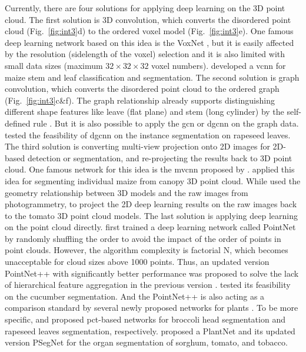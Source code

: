 

Currently, there are four solutions for applying deep learning on the 3D point cloud. 
The first solution is 3D convolution, which converts the disordered point cloud (Fig.~\ref{fig:int3}d) to the ordered voxel model (Fig.~\ref{fig:int3}e). One famous deep learning network based on this idea is the VoxNet \citep{Maturana_VoxNet_2015}, but it is easily affected by the resolution (sidelength of the voxel) selection and it is also limited with small data sizes (maximum $32 \times 32 \times 32$ voxel numbers). \citet{jin_separating_2020} developed a \gls{vcnn} for maize stem and leaf classification and segmentation. 
The second solution is graph convolution, which converts the disordered point cloud to the ordered graph (Fig.~\ref{fig:int3}c\&f). The graph relationship already supports distinguishing different shape features like leave (flat plane) and stem (long cylinder) by the self-defined rule \citep{mirande_graph-based_2022}. But it is also possible to apply the \gls{gcn} \citep{wu_comprehensive_2021,zhou_graph_2020} or \gls{dgcnn} \citep{phan_dgcnn_2018} on the graph data. \citet{du_pst_2023} tested the feasibility of \gls{dgcnn} on the instance segmentation on rapeseed leaves.
The third solution is converting multi-view projection onto 2D images for 2D-based detection or segmentation, and re-projecting the results back to 3D point cloud. One famous network for this idea is the \gls{mvcnn} proposed by \citet{su_mvcnn_2015}. \citet{jin_deep_2018} applied this idea for segmenting individual maize from canopy 3D point cloud. While \citet{van_plant_2019} used the geometry relationship between 3D models and the raw images from photogrammetry, to project the 2D deep learning results on the raw images back to the tomato 3D point cloud models.
The last solution is applying deep learning on the point cloud directly. \citet{qi_pointnet_2016} first trained a deep learning network called PointNet by randomly shuffling the order to avoid the impact of the order of points in point clouds. However, the algorithm complexity is factorial N, which becomes unacceptable for cloud sizes above 1000 points. Thus, an updated version PointNet++ with significantly better performance was proposed to solve the lack of hierarchical feature aggregation in the previous version \citep{qi_pointnet_2017}. \citet{boogaard_boosting_2021} tested its feasibility on the cucumber segmentation. And the PointNet++ is also acting as a comparison standard by several newly proposed networks for plants \citep{jin_separating_2020,zhou_automated_2022,du_pst_2023,li_psegnet_2022}. To be more specific, \citet{zhou_automated_2022} and \citet{du_pst_2023} proposed \gls{pct}-based networks for broccoli head segmentation and rapeseed leaves segmentation, respectively. \citet{li_plantnet_2022} proposed a PlantNet and its updated version PSegNet \citep{li_psegnet_2022} for the organ segmentation of sorghum, tomato, and tobacco.

